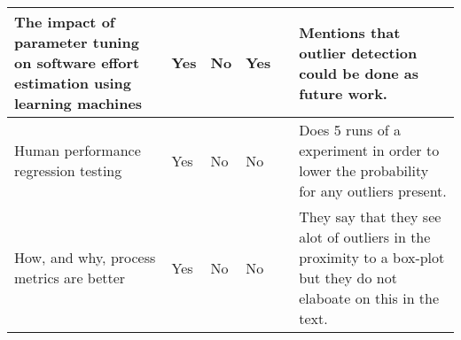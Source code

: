 \begin{landscape}
\begin{longtabu} {X[3]XXXXX[2]}
The impact of parameter tuning on software effort estimation using learning machines\strut                                                                      & Yes                       & No  & Yes                       & \citet{song2013impact}           & Mentions that outlier detection could be done as future work.\strut
\\ \hline

Human performance regression testing\strut                                                                                                                      & Yes                       & No & No                        & \citet{swearngin2013human}       & Does 5 runs of a experiment in order to lower the probability for any outliers present.\strut
\\ \hline

How, and why, process metrics are better\strut                                                                                                                  & Yes                       & No  & No                       & \citet{rahman2013and}            & They say that they see alot of outliers in the proximity to a box-plot but they do not elaboate on this in the text.\strut
\\ \hline
\end{longtabu}
\end{landscape}

